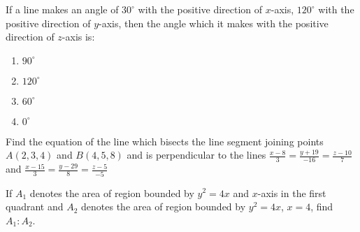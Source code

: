 	\item If a line makes an angle of $30^{\circ}$ with the positive direction of $x$-axis, $120^{\circ}$ with the positive direction of $y$-axis, then the angle which it makes with the positive direction of $z$-axis is:
		\begin{enumerate}
			\item $90^{\circ}$
			\item $120^{\circ}$
			\item $60^{\circ}$
			\item $0^{\circ}$
		\end{enumerate}
	\item Find the equation of the line which bisects the line segment joining points $A(2,3,4)$ and $B(4,5,8)$ and is perpendicular to the lines $\frac{x-8}{3} = \frac{y+19}{-16} = \frac{z-10}{7}$ and $\frac{x-15}{3} = \frac{y-29}{8} = \frac{z-5}{-5}$
	\item If $A_{1}$ denotes the area of region bounded by $y^{2} = 4x$ and $x$-axis in the first quadrant and $A_{2}$ denotes the area of region bounded by $y^{2} = 4x$, $x=4$, find $A_{1} : A_{2}$.

